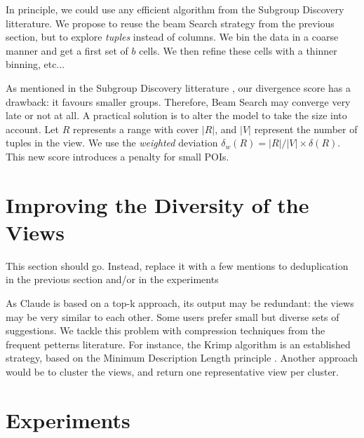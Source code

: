 In principle, we could use any efficient algorithm from the Subgroup Discovery
litterature.  We propose to reuse the beam Search strategy from the previous
section, but to explore \emph{tuples} instead of columns. We bin the data in a
coarse manner and get a first set of $b$ cells. We then refine these cells with
a thinner binning, etc...

As mentioned in the Subgroup Discovery litterature \cite{van2011non}, our
divergence score has a drawback: it favours smaller groups.  Therefore, Beam
Search may converge very late or not at all.  A practical
solution is to alter the model to take the size into account. Let $R$
represents a range with cover $|R|$, and $|V|$ represent the number of tuples
in the view. We use the \emph{weighted} deviation $\delta_w(R) = |R|/|V| \times
\delta(R)$. This new score introduces a penalty for small POIs.


\section{Improving the Diversity of the Views}

{ \color{red} This section should go. Instead, replace it with a few mentions
to deduplication in the previous section and/or in the experiments}

As Claude is based on a top-k approach, its output may be redundant: the views
may be very similar to each other.  Some users prefer small but diverse sets of
suggestions.  We tackle this problem with compression techniques from the
frequent petterns literature. For instance, the Krimp algorithm is an
established strategy, based on the Minimum Description Length principle
\cite{vreeken2011krimp}. Another approach would be to cluster the views, and
return one representative view per cluster.


\section{Experiments}
\label{sec:experiments}

